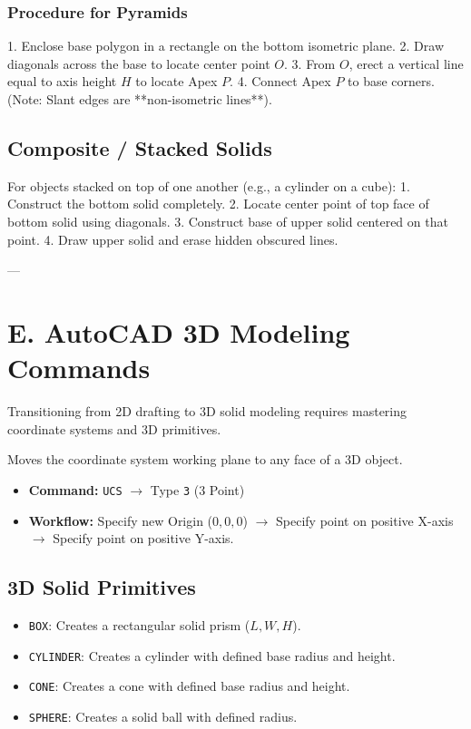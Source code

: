 \subsubsection{Procedure for Pyramids}
1. Enclose base polygon in a rectangle on the bottom isometric plane.
2. Draw diagonals across the base to locate center point $O$.
3. From $O$, erect a vertical line equal to axis height $H$ to locate Apex $P$.
4. Connect Apex $P$ to base corners. (Note: Slant edges are **non-isometric lines**).

\subsection{Composite / Stacked Solids}
For objects stacked on top of one another (e.g., a cylinder on a cube):
1. Construct the bottom solid completely.
2. Locate center point of top face of bottom solid using diagonals.
3. Construct base of upper solid centered on that point.
4. Draw upper solid and erase hidden obscured lines.

---

\section{E. AutoCAD 3D Modeling Commands}

Transitioning from 2D drafting to 3D solid modeling requires mastering coordinate systems and 3D primitives.

\begin{autocadcmd}
Moves the coordinate system working plane to any face of a 3D object.
\begin{itemize}
    \item \textbf{Command:} \texttt{UCS} $\to$ Type \texttt{3} (3 Point)
    \item \textbf{Workflow:} Specify new Origin ($0,0,0$) $\to$ Specify point on positive X-axis $\to$ Specify point on positive Y-axis.
\end{itemize}
\end{autocadcmd}

\subsection{3D Solid Primitives}
\begin{itemize}
    \item \texttt{BOX}: Creates a rectangular solid prism ($L, W, H$).
    \item \texttt{CYLINDER}: Creates a cylinder with defined base radius and height.
    \item \texttt{CONE}: Creates a cone with defined base radius and height.
    \item \texttt{SPHERE}: Creates a solid ball with defined radius.
\end{itemize}

